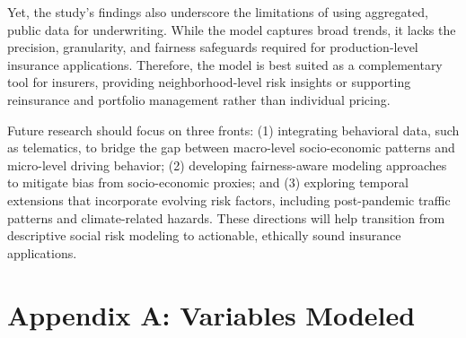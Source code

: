 \documentclass[
  number,
  review,
  3p]{elsarticle}
\begin{document}
Yet, the study's findings also underscore the limitations of using
aggregated, public data for underwriting. While the model captures broad
trends, it lacks the precision, granularity, and fairness safeguards
required for production-level insurance applications. Therefore, the
model is best suited as a complementary tool for insurers, providing
neighborhood-level risk insights or supporting reinsurance and portfolio
management rather than individual pricing.

Future research should focus on three fronts: (1) integrating behavioral
data, such as telematics, to bridge the gap between macro-level
socio-economic patterns and micro-level driving behavior; (2) developing
fairness-aware modeling approaches to mitigate bias from socio-economic
proxies; and (3) exploring temporal extensions that incorporate evolving
risk factors, including post-pandemic traffic patterns and
climate-related hazards. These directions will help transition from
descriptive social risk modeling to actionable, ethically sound
insurance applications.

\section{Appendix A: Variables
Modeled}\label{appendix-a-variables-modeled}
\end{document}
